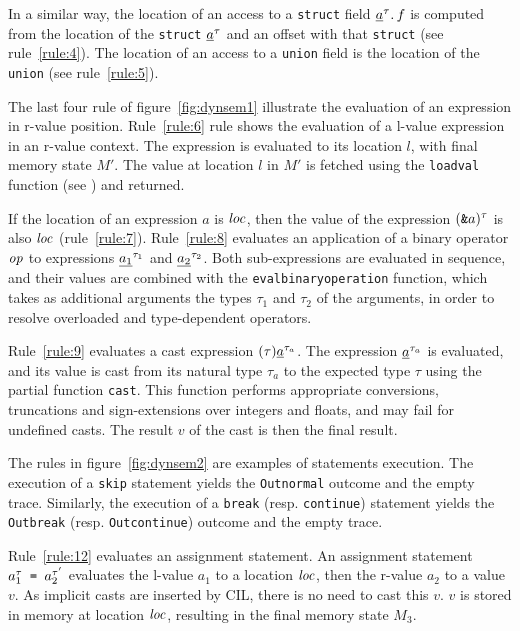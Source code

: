 \documentclass[namedreferences]{kluwer}
\begin{document}
\begin{article}
In a similar way, the location of an access to a {\tt struct} field 
${\underline{a}}^{\tau} .\, f$ is computed from the location of the {\tt struct} 
${\underline{a}}^{\tau}$ and an offset with that {\tt struct} (see 
rule~\ref{rule:4}).
The location of an access to a {\tt union} field is the location of
the {\tt union} (see rule~\ref{rule:5}).

The last four rule of figure~\ref{fig:dynsem1} illustrate the 
evaluation of an expression in r-value position.
Rule~\ref{rule:6} rule shows the evaluation of a l-value expression in an
r-value context.  The expression is evaluated to its location $l$,
with final memory state $M'$.  The value at location $l$ in $M'$ is
fetched using the {\tt loadval} function (see 
) and returned.

If the location of an expression $a$ is ${\it loc}$, then
the value of the expression $(\hbox{{\tt \&}}a)^\tau$ is also ${\it loc}$
(rule~\ref{rule:7}).
Rule~\ref{rule:8} evaluates an application of a binary operator ${\it op}$ to
expressions ${\underline{a_1}}^{\tau_1}$ and ${\underline{a_2}}^{\tau_2}$.  
Both sub-expressions are evaluated in
sequence, and their values are combined with the
{\tt eval{}binary{}operation} function, which takes as additional 
arguments the types $\tau_1$ and $\tau_2$ of the arguments, in order to resolve
overloaded and type-dependent operators.  

Rule~\ref{rule:9} evaluates a cast expression $(\tau){\underline{a}}^{\tau_a}$.
The expression ${\underline{a}}^{\tau_a}$ is evaluated, and its
value is cast from its natural type $\tau_a$ to the expected type
$\tau$ using the partial function {\tt cast}.  This function
performs appropriate conversions, truncations and sign-extensions over
integers and floats, and may fail for undefined casts. The result $v$
of the cast is then the final result.

The rules in figure~\ref{fig:dynsem2} are
examples of statements execution.
The execution of a {\tt skip} statement yields the {\tt Out{}normal}
outcome and the empty trace.
Similarly, the execution of a {\tt break} (resp. {\tt continue}) statement 
yields the {\tt Out{}break} (resp. {\tt Out{}continue})
outcome and the empty trace.
 
Rule~\ref{rule:12} evaluates an assignment statement.
An assignment statement $a_1^\tau \hbox{{\tt \ =\ }} a_2^{\tau'}$ evaluates
the l-value $a_1$ to a location ${\it loc}$, then the r-value $a_2$ to a value $v$.
As implicit casts are inserted by CIL, there is no need to cast this $v$. 
$v$ is stored in memory at location ${\it loc}$, resulting in the final memory
 state $M_3$.


\end{article}
\end{document}
